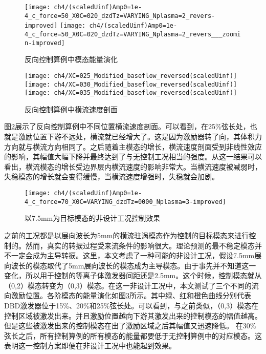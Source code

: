 \begin{figure}[htb]
\centering
\texttt{[image: ch4/(scaledUinf)Amp0=1e-4\_c\_force=50\_X0C=020\_dzdTz=VARYING\_Nplasma=2\_revers-improved]}
\texttt{[image: ch4/(scaledUinf)Amp0=1e-4\_c\_force=50\_X0C=020\_dzdTz=VARYING\_Nplasma=2\_revers\_\_\_zoomin-improved]}
\caption{反向控制算例中模态能量演化}%
\label{f:model_energy_revers}
\end{figure}

\begin{figure}[htb]
\centering
\texttt{[image: ch4/XC=025\_Modified\_baseflow\_reversed(scaledUinf)]}
\texttt{[image: ch4/XC=030\_Modified\_baseflow\_reversed(scaledUinf)]}
\texttt{[image: ch4/XC=035\_Modified\_baseflow\_reversed(scaledUinf)]}
\caption{反向控制算例中横流速度剖面}%
\label{f:inverse_meanflow}
\end{figure}

图\ref{f:inverse_meanflow}展示了反向控制算例中不同位置横流速度剖面。可以看到，在25\%弦长处，也就是激励位置下游不远处，横流就已经增大了。这是因为激励器转了向，其体积力方向就与横流方向相同了。之后随着主模态的增长，横流速度剖面受到非线性效应的影响，其幅值大幅下降并最终达到了与无控制工况相当的强度。从这一结果可以看出，横流模态的增长受边界层内横流速度的影响非常大。当横流速度被减弱时，失稳模态的增长就会变得缓慢，当横流速度增强时，失稳就会加剧。
\begin{figure}[htb]
\centering
\texttt{[image: ch4/(scaledUinf)Amp0=1e-4\_c\_force=70\_X0C=VARYING\_dzdTz=0000\_Nplasma=3-improved]}
\caption{以7.5mm为目标模态的非设计工况控制效果}%
\label{f:7.5mm}
\end{figure}

之前的工况都是以展向波长为5mm的横流驻涡模态作为控制的目标模态来进行控制的。然而，真实的转捩过程受来流条件的影响很大。理论预测的最不稳定模态并不一定会成为主导转捩。这里，本文考虑了一种可能的非设计工况，假设7.5mm展向波长的模态取代了5mm展向波长的模态成为主导模态。由于事先并不知道这一变化，所以用于控制的等离子体激发器间距还是2.5mm。这个时候，控制模态就从（0,2）模态转变为（0,3）模态。在这一非设计工况中，本文测试了三个不同的流向激励位置。各阶模态的能量演化如图\ref{f:7.5mm}所示。其中绿、红和橙色曲线分别代表DBD激发器位于15\%、20\%和25\%弦长处。可以看到，与之前类似，（0,3）模态在控制区域被激发出来。并且激励位置越向下游其激发出来的控制模态的幅值越高。但是这些被激发出来的控制模态在出了激励区域之后其幅值又迅速降低。 在30\%弦长之后，所有控制算例的所有模态的能量都要低于无控制算例中的对应模态。这表明这一控制方案即便在非设计工况中也能起到效果。

